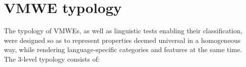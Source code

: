\documentclass[output=paper,
modfonts,
]{langscibook}
\begin{document}
\section{VMWE typology}
\label{sec:typology}
%
The typology of VMWEs, 
as well as linguistic tests enabling their %
classification, were designed so as to represent %
properties deemed universal in a homogeneous way, while rendering language-specific categories and features at the same time. %
%
The 3-level typology consists of:
\end{document}
